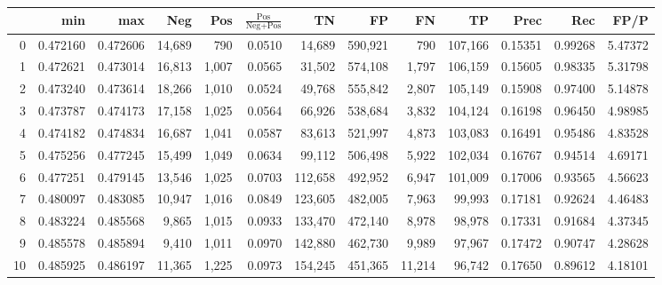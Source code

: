 \begin{tabular}{rrrrrrrrrrrrr}
\toprule
{} &       min &       max &     Neg &    Pos & $\frac{\text{Pos}}{\text{Neg}+\text{Pos}}$ &       TN &       FP &       FN &       TP &     Prec &      Rec &     FP/P \\
\midrule
0  &  0.472160 &  0.472606 &  14,689 &    790 &                                     0.0510 &   14,689 &  590,921 &      790 &  107,166 &  0.15351 &  0.99268 &  5.47372 \\
1  &  0.472621 &  0.473014 &  16,813 &  1,007 &                                     0.0565 &   31,502 &  574,108 &    1,797 &  106,159 &  0.15605 &  0.98335 &  5.31798 \\
2  &  0.473240 &  0.473614 &  18,266 &  1,010 &                                     0.0524 &   49,768 &  555,842 &    2,807 &  105,149 &  0.15908 &  0.97400 &  5.14878 \\
3  &  0.473787 &  0.474173 &  17,158 &  1,025 &                                     0.0564 &   66,926 &  538,684 &    3,832 &  104,124 &  0.16198 &  0.96450 &  4.98985 \\
4  &  0.474182 &  0.474834 &  16,687 &  1,041 &                                     0.0587 &   83,613 &  521,997 &    4,873 &  103,083 &  0.16491 &  0.95486 &  4.83528 \\
5  &  0.475256 &  0.477245 &  15,499 &  1,049 &                                     0.0634 &   99,112 &  506,498 &    5,922 &  102,034 &  0.16767 &  0.94514 &  4.69171 \\
6  &  0.477251 &  0.479145 &  13,546 &  1,025 &                                     0.0703 &  112,658 &  492,952 &    6,947 &  101,009 &  0.17006 &  0.93565 &  4.56623 \\
7  &  0.480097 &  0.483085 &  10,947 &  1,016 &                                     0.0849 &  123,605 &  482,005 &    7,963 &   99,993 &  0.17181 &  0.92624 &  4.46483 \\
8  &  0.483224 &  0.485568 &   9,865 &  1,015 &                                     0.0933 &  133,470 &  472,140 &    8,978 &   98,978 &  0.17331 &  0.91684 &  4.37345 \\
9  &  0.485578 &  0.485894 &   9,410 &  1,011 &                                     0.0970 &  142,880 &  462,730 &    9,989 &   97,967 &  0.17472 &  0.90747 &  4.28628 \\
10 &  0.485925 &  0.486197 &  11,365 &  1,225 &                                     0.0973 &  154,245 &  451,365 &   11,214 &   96,742 &  0.17650 &  0.89612 &  4.18101 \\

\end{tabular}
